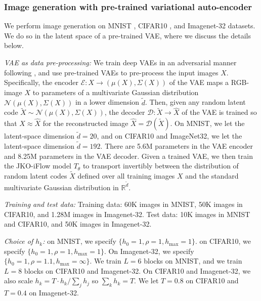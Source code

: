 \documentclass{article}
\theoremstyle{remark}
\theoremstyle{plain}
\newcommand{\JKO}{JKO-iFlow}
\newcommand{\R}{\mathbb{R}}
\newcommand{\calN}{\mathcal{N}}
\newcommand{\revold}[1]{{\color{black}#1}}
\begin{document}
{\revold{
\subsubsection{Image generation with pre-trained variational auto-encoder}

 
We perform image generation on MNIST \citep{deng2012mnist}, CIFAR10 \citep{krizhevsky2009learning}, and Imagenet-32 \citep{deng2009imagenet} datasets. We do so in the latent space of a pre-trained VAE, where we discuss the details below.

\vspace{0.1in}
\noindent \textit{VAE as data pre-processing:}
We train deep VAEs in an adversarial manner following \citep{esser2021taming}, and use pre-trained VAEs to pre-process the input images $X$. Specifically, the encoder $\mathcal{E}: X \rightarrow (\mu(X), \Sigma(X))$ of the VAE maps a RGB-image $X$ to parameters of a multivariate Gaussian distribution $\calN(\mu(X), \Sigma(X))$ in a lower dimension $\tilde{d}$. Then, given any random latent code $\tilde{X} \sim \calN(\mu(X), \Sigma(X))$, the decoder $\mathcal{D}: \tilde{X} \rightarrow \hat{X}$ of the VAE is trained so that $X\approx \hat{X}$ for the reconstructed image $\hat{X}=\mathcal{D}(\tilde{X}).$ On MNIST, we let the latent-space dimension $\tilde{d}=20$, and on CIFAR10 and ImageNet32, we let the latent-space dimension $\tilde{d}=192$. There are 5.6M parameters in the VAE encoder and 8.25M parameters in the VAE decoder.
% 
Given a trained VAE, we then train the \JKO{} model $T_{\theta}$ to transport invertibly between the distribution of random latent codes $\tilde{X}$ defined over all training images $X$ and the standard multivariate Gaussian distribution in $\R^{\tilde{d}}$. 

\vspace{0.1in}
\noindent \textit{Training and test data:} Training data: 60K images in MNIST, 50K images in CIFAR10, and 1.28M images in Imagenet-32. Test data: 10K images in MNIST and CIFAR10, and 50K images in Imagenet-32.


\vspace{0.1in}
\noindent \textit{Choice of $h_k$:} 
on MNIST, we specify $\{h_0=1, \rho=1, h_{\max}=1\}$.
% 
on CIFAR10, we specify $\{h_0=1, \rho=1, h_{\max}=1\}$.
%
On Imagenet-32, we specify $\{h_0=1, \rho=1.1, h_{\max}=\infty\}$.
% 
We train $L=6$ blocks on MNIST, and we train $L=8$ blocks on CIFAR10 and Imagenet-32. On CIFAR10 and Imagenet-32, we also scale $h_k=T \cdot h_k/\sum_j h_j$ so $\sum_k h_k = T$. We let $T=0.8$ on CIFAR10 and $T=0.4$ on Imagenet-32.

}}
\end{document}

